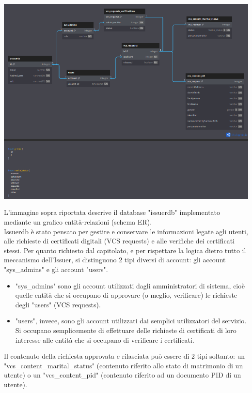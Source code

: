 \begin{center}
    \includegraphics[scale = 0.9]{./res/img/issuerdb.png}
  \end{center}
L'immagine sopra riportata descrive il database "issuerdb" implementato mediante un grafico entità-relazioni (schema ER).\\
Issuerdb è stato pensato per gestire e conservare le informazioni legate agli utenti, alle richieste di certificati digitali (VCS requests) e alle verifiche dei certificati stessi.
Per quanto richiesto dal capitolato, e per rispettare la logica dietro tutto il meccanismo dell'Issuer, si distinguono 2 tipi diversi di account: gli account "sys\_admins" e gli account "users".\\
\begin{itemize}
\item "sys\_admins" sono gli account utilizzati dagli amministratori di sistema, cioè quelle entità che si occupano di approvare (o meglio, verificare) le richieste degli "users" (VCS requests).\\
\item "users", invece, sono gli account utilizzati dai semplici utilizzatori del servizio. Si occupano semplicemente di effettuare delle richieste di certificati di loro interesse alle entità che si occupano di verificare i certificati.\\
\end{itemize}
Il contenuto della richiesta approvata e rilasciata può essere di 2 tipi soltanto: un "vcs\_content\_marital\_status" (contenuto riferito allo stato di matrimonio di un utente) o un "vcs\_content\_pid" (contenuto riferito ad un documento PID di un utente).\\

